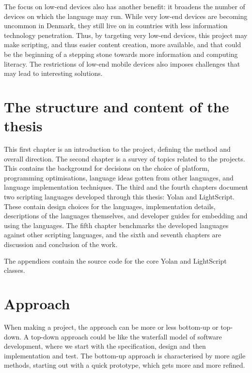 \documentclass[11pt]{report}
\begin{document}
The focus on low-end devices also has another benefit:
it broadens the number of devices on which the language may run.
While very low-end devices are becoming uncommon in Denmark,
they still live on in countries with less information technology penetration.
Thus,  by targeting very low-end devices, 
this project may make scripting, and thus easier content creation,
more available,
and that could be the beginning of a stepping stone 
towards more information and computing literacy.
The restrictions of low-end mobile devices also imposes challenges that may lead to interesting solutions.

\begin{comment}
From a personal point of view, 
I would like to get started on development for mobile devices, 
and would also like to brush up on programming language implementation.
Design and implementation of a scripting language for mobile devices is spot on this topic.
\end{comment}


\section{The structure and content of the thesis}

This first chapter is an introduction to the project, defining the method and overall direction. 
The second chapter is a survey of topics related to the projects. This contains the background for decisions on the choice of platform, programming optimisations, language ideas gotten from other languages, and language implementation techniques.
The third and the fourth chapters document two scripting languages developed through this thesis: Yolan and LightScript. These contain design choices for the languages, implementation details, descriptions of the languages themselves, and developer guides for embedding and using the languages.
The fifth chapter benchmarks the developed languages against other scripting languages,
and the sixth and seventh chapters are discussion and conclusion of the work.

The appendices contain the source code for the core Yolan and LightScript classes.

\section{Approach}
\label{method}

When making a project, the approach can be
more or less bottom-up or top-down.
A top-down approach could be like the waterfall model \cite{waterfall} of software development,
where we start with the specification, design and then implementation and test.
The bottom-up approach is characterised by more agile \cite{agile-manifesto} methods, starting out with a quick prototype, which gets more and more refined.
\end{document}
